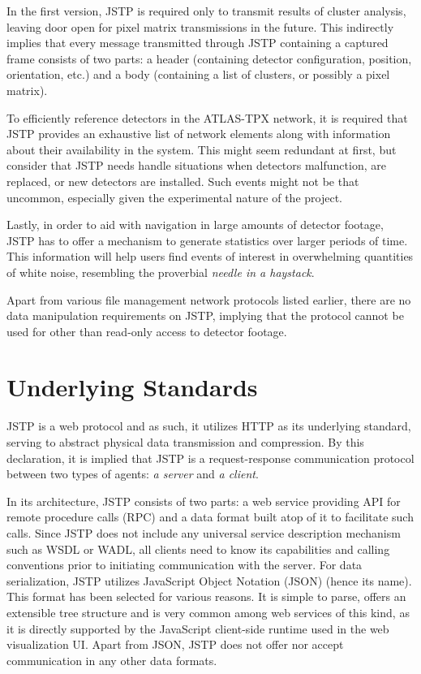 In the first version, JSTP is required only to transmit results of cluster analysis, leaving door open for pixel matrix transmissions in the future. This indirectly implies that every message transmitted through JSTP containing a captured frame consists of two parts: a header (containing detector configuration, position, orientation, etc.) and a body (containing a list of clusters, or possibly a pixel matrix).

To efficiently reference detectors in the ATLAS-TPX network, it is required that JSTP provides an exhaustive list of network elements along with information about their availability in the system. This might seem redundant at first, but consider that JSTP needs handle situations when detectors malfunction, are replaced, or new detectors are installed. Such events might not be that uncommon, especially given the experimental nature of the project.

Lastly, in order to aid with navigation in large amounts of detector footage, JSTP has to offer a mechanism to generate statistics over larger periods of time. This information will help users find events of interest in overwhelming quantities of white noise, resembling the proverbial \textit{needle in a haystack}.

Apart from various file management network protocols listed earlier, there are no data manipulation requirements on JSTP, implying that the protocol cannot be used for other than read-only access to detector footage.

\section{Underlying Standards}
JSTP is a web protocol and as such, it utilizes HTTP as its underlying standard, serving to abstract physical data transmission and compression. By this declaration, it is implied that JSTP is a request-response communication protocol between two types of agents: \textit{a server} and \textit{a client}.

In its architecture, JSTP consists of two parts: a web service providing API for remote procedure calls (RPC) and a data format built atop of it to facilitate such calls. Since JSTP does not include any universal service description mechanism such as WSDL or WADL, all clients need to know its capabilities and calling conventions prior to initiating communication with the server. For data serialization, JSTP utilizes JavaScript Object Notation (JSON) (hence its name). This format has been selected for various reasons. It is simple to parse, offers an extensible tree structure and is very common among web services of this kind, as it is directly supported by the JavaScript client-side runtime used in the web visualization UI. Apart from JSON, JSTP does not offer nor accept communication in any other data formats.

